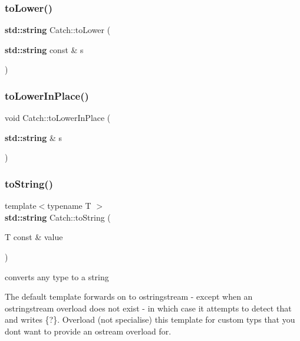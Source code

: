 \subsubsection{\texorpdfstring{to\+Lower()}{toLower()}}
{\footnotesize\ttfamily \textbf{ std\+::string} Catch\+::to\+Lower (\begin{DoxyParamCaption}\item[{\textbf{ std\+::string} const \&}]{s }\end{DoxyParamCaption})}

\mbox{\label{namespace_catch_a0760dbe87d090a55a35414db57d272c4}} 
\subsubsection{\texorpdfstring{to\+Lower\+In\+Place()}{toLowerInPlace()}}
{\footnotesize\ttfamily void Catch\+::to\+Lower\+In\+Place (\begin{DoxyParamCaption}\item[{\textbf{ std\+::string} \&}]{s }\end{DoxyParamCaption})}

\mbox{\label{namespace_catch_adbd1730f961da94d9ed284f70fd7a28b}} 
\subsubsection{\texorpdfstring{to\+String()}{toString()}\hspace{0.1cm}{\footnotesize\ttfamily [1/17]}}
{\footnotesize\ttfamily template$<$typename T $>$ \\
\textbf{ std\+::string} Catch\+::to\+String (\begin{DoxyParamCaption}\item[{T const \&}]{value }\end{DoxyParamCaption})}



converts any type to a string 

The default template forwards on to ostringstream -\/ except when an ostringstream overload does not exist -\/ in which case it attempts to detect that and writes \{?\}. Overload (not specialise) this template for custom typs that you don\textquotesingle{}t want to provide an ostream overload for. \mbox{\label{namespace_catch_ad6e969257437cf007b8b5017b22e570c}} 
